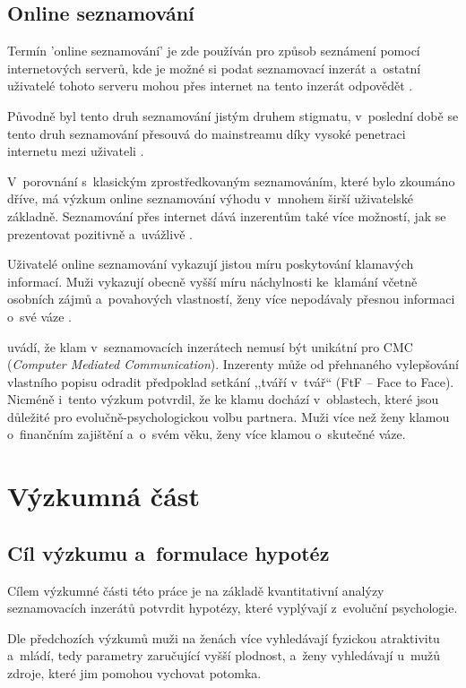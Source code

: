 \documentclass[a4paper, 12pt, notitlepage, oneside, numbers=noenddot]{report}
\begin{document}
\section{Online seznamování}

Termín 'online seznamování' je zde používán pro způsob seznámení pomocí
internetových serverů, kde je možné si podat seznamovací inzerát
a~ostatní uživatelé tohoto serveru mohou přes internet na tento
inzerát odpovědět \citep{HallEtAl2010,EllisonEtAl2006}.

Původně byl tento druh seznamování jistým druhem stigmatu, v~poslední
době se tento druh seznamování přesouvá do mainstreamu díky vysoké
penetraci internetu mezi uživateli \citep{GibbsEtAl2006, HallEtAl2010,
  EllisonEtAl2006}.

V~porovnání s~klasickým zprostředkovaným seznamováním, které bylo
zkoumáno dříve, má výzkum online seznamování výhodu v~mnohem širší
uživatelské základně.  Seznamování přes internet dává inzerentům také
více možností, jak se prezentovat pozitivně a~uvážlivě
\citep{GibbsEtAl2006}.

Uživatelé online seznamování vykazují jistou míru poskytování
klamavých informací.  Muži vykazují obecně vyšší míru náchylnosti
ke~klamání včetně osobních zájmů a~povahových vlastností, ženy více
nepodávaly přesnou informaci o~své váze \citep{HallEtAl2010}.

\citet{HallEtAl2010} uvádí, že klam v~seznamovacích inzerátech nemusí
být unikátní pro CMC (\textit{Computer Mediated Communication}).
Inzerenty může od přehnaného vylepšování vlastního popisu odradit
předpoklad setkání ,,tváří v~tvář`` (FtF -- Face to Face).  Nicméně
i~tento výzkum potvrdil, že ke klamu dochází v~oblastech, které jsou
důležité pro evolučně-psychologickou volbu partnera.  Muži více než
ženy klamou o~finančním zajištění a~o~svém věku, ženy více klamou
o~skutečné váze.

\chapter{Výzkumná část}
\section{Cíl výzkumu a~formulace hypotéz}
Cílem výzkumné části této práce je na základě kvantitativní analýzy
seznamovacích inzerátů potvrdit hypotézy, které vyplývají z~evoluční
psychologie.

Dle předchozích výzkumů \citep{BussEtAl1990, GreenlessMcGrew1994,
  Gil-BurmanPelaezSanchez2002, WayfordDunbar1995, HarrisonSaeed1977}
muži na ženách více vyhledávají fyzickou atraktivitu a~mládí, tedy
parametry zaručující vyšší plodnost, a~ženy vyhledávají u~mužů zdroje,
které jim pomohou vychovat potomka.
\end{document}
